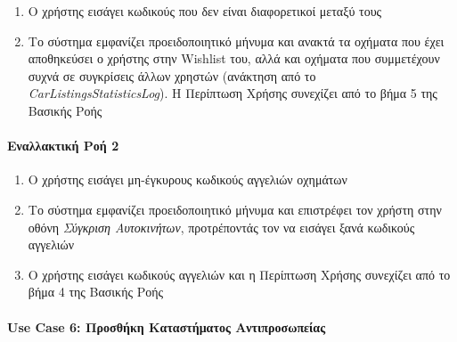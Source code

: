 \documentclass{../ol-softwaremanual}
\begin{document}
	\begin{enumerate}
		\item Ο χρήστης εισάγει κωδικούς που δεν είναι διαφορετικοί μεταξύ τους
		\item Το σύστημα εμφανίζει προειδοποιητικό μήνυμα και ανακτά τα οχήματα που έχει αποθηκεύσει ο χρήστης στην \en Wishlist \gr του, αλλά και οχήματα που συμμετέχουν συχνά σε συγκρίσεις άλλων χρηστών (ανάκτηση από το \en \textit{CarListingsStatisticsLog}\gr). Η Περίπτωση Χρήσης συνεχίζει από το βήμα 5 της Βασικής Ροής 
	\end{enumerate}
	
	\paragraph{Εναλλακτική Ροή 2}
	\begin{enumerate}
		\item Ο χρήστης εισάγει μη-έγκυρους κωδικούς αγγελιών οχημάτων
		\item Το σύστημα εμφανίζει προειδοποιητικό μήνυμα και επιστρέφει τον χρήστη στην οθόνη \textit{Σύγκριση Αυτοκινήτων}, προτρέποντάς τον να εισάγει ξανά κωδικούς αγγελιών
		\item Ο χρήστης εισάγει κωδικούς αγγελιών και η Περίπτωση Χρήσης συνεχίζει από το βήμα 4 της Βασικής Ροής		
	\end{enumerate}
	
	
	\paragraph{\en Use Case 6: \gr Προσθήκη Καταστήματος Αντιπροσωπείας}
	
\end{document}
